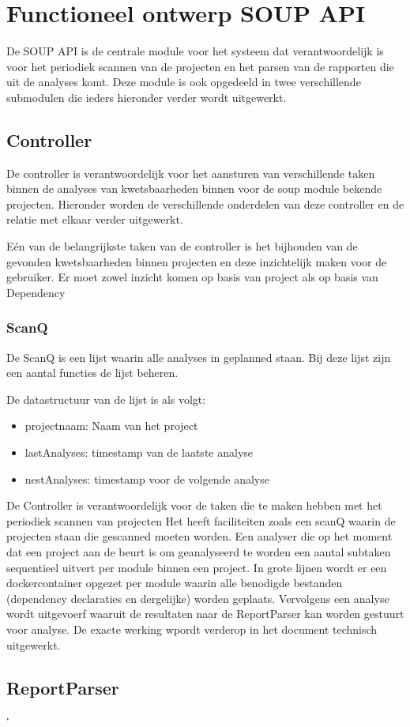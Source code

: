 \chapter{Functioneel ontwerp SOUP API}\label{ch:impl soup api}
De SOUP API is de centrale module voor het systeem dat verantwoordelijk is voor het periodiek scannen van de projecten en het parsen van de rapporten die uit de analyses komt. Deze module is ook opgedeeld in twee verschillende submodulen die ieders hieronder verder wordt uitgewerkt.

\section{Controller}\label{sec:Implcontroller}
De controller is verantwoordelijk voor het aansturen van verschillende taken binnen de analyses van kwetsbaarheden binnen voor de soup module bekende projecten. Hieronder worden de verschillende onderdelen van deze controller en de relatie met elkaar verder uitgewerkt.

Eén van de belangrijkste taken van de controller is het bijhouden van de gevonden kwetsbaarheden binnen projecten en deze inzichtelijk maken voor de gebruiker. Er moet zowel inzicht komen op basis van project als op basis van Dependency
\subsection{ScanQ}
De ScanQ is een lijst waarin alle analyses in geplanned staan. Bij deze lijst zijn een aantal functies de lijst beheren.

De datastructuur van de lijst is als volgt:
\begin{itemize}
    \item projectnaam: Naam van het project
    \item lastAnalyses: timestamp van de laatste analyse
    \item nestAnalyses: timestamp voor de volgende analyse
\end{itemize}



De Controller is verantwoordelijk voor de taken die te maken hebben met het periodiek scannen van projecten Het heeft faciliteiten zoals een scanQ waarin de projecten staan die gescanned moeten worden. Een analyser die op het moment dat een project aan de beurt is om geanalyseerd te worden een aantal subtaken sequentieel uitvert per module binnen een project.
In grote lijnen wordt er een dockercontainer opgezet per module waarin alle benodigde bestanden (dependency declaraties en dergelijke) worden geplaats. Vervolgens een analyse wordt uitgevoerf waaruit de resultaten naar de ReportParser kan worden gestuurt voor analyse. De exacte werking wpordt verderop in het document technisch uitgewerkt.


\section{ReportParser}`
